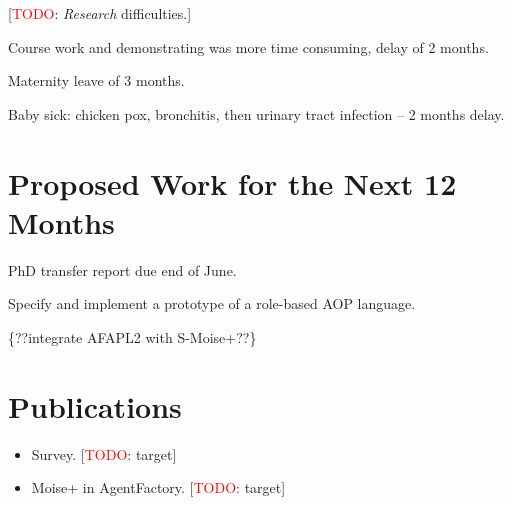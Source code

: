 \documentclass{article}
\newcommand{\todo}[1]{[\textcolor{red}{TODO}: #1]}
\begin{document}
\todo{\emph{Research} difficulties.}

Course work and demonstrating was more time consuming, delay of 2
months.

Maternity leave of 3 months. 

Baby sick: chicken pox, bronchitis, then urinary tract infection -- 2 months
delay.

\section{Proposed Work for the Next 12 Months}

PhD transfer report due end of June.

Specify and implement a prototype of a role-based AOP language.

\{??integrate AFAPL2 with S-Moise+??\}

\section{Publications}

\begin{itemize}
\item Survey. \todo{target}
\item Moise+ in AgentFactory. \todo{target}
\end{itemize}
\end{document}
